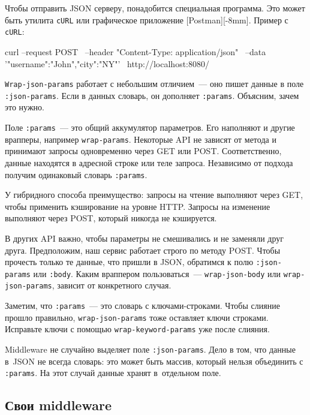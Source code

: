 
Чтобы отправить JSON серверу, понадобится специальная программа. Это может быть
утилита \verb|cURL| или графическое приложение
[Post\-man][-8mm]. Пример с \verb|cURL|:

\begin{english}
  \begin{bash}
curl --request POST \
     --header "Content-Type: application/json" \
     --data '{"username":"John","city":"NY"}' \
     http://localhost:8080/
  \end{bash}
\end{english}

\verb|Wrap-json-params| работает с небольшим отличием~--- оно пишет данные в
поле \verb|:json-params|. Если в данных словарь, он дополняет
\verb|:params|. Объясним, зачем это нужно.

Поле \verb|:params|~--- это общий аккумулятор параметров. Его наполняют и другие
врапперы, например \verb|wrap-params|. Некоторые API не зависят от метода и
принимают запросы одновременно через GET или POST. Соответственно, данные
находятся в адресной строке или теле запроса. Независимо от подхода получим
одинаковый словарь \verb|:params|.

У гибридного способа преимущество: запросы на чтение выполняют через GET, чтобы
применить кэширование на уровне HTTP. Запросы на изменение выполняют через POST,
который никогда не кэшируется.

В других API важно, чтобы параметры не смешивались и не заменяли друг
друга. Предположим, наш сервис работает строго по методу POST. Чтобы прочесть
только те данные, что пришли в JSON, обратимся к полю \verb|:json-params| или
\verb|:body|. Каким враппером пользоваться~--- \verb|wrap-json-body| или
\verb|wrap-json-params|, зависит от конкретного случая.

\index{middleware!wrap-json-params}

Заметим, что \verb|:params|~--- это словарь с ключами-строками. Чтобы слияние
прошло правильно, \verb|wrap-json-params| тоже оставляет ключи
строками. Исправьте ключи с помощью \verb|wrap-keyword-params| уже после
слияния.

Middleware не случайно выделяет поле \verb|:json-params|. Дело в том, что данные
в~JSON не всегда словарь: это может быть массив, который нельзя объединить с
\verb|:params|. На этот случай данные хранят в~отдельном поле.

\subsection{Свои middleware}

